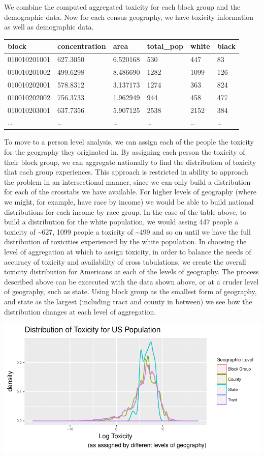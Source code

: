 \documentclass[12pt,twoside]{dukestatscithesis}
\theoremstyle{definition}
\theoremstyle{definition}
\theoremstyle{definition}
\theoremstyle{remark}
\begin{document}
We combine the computed aggregated toxicity for each block group and the
demographic data. Now for each census geography, we have toxicity
information as well as demographic data.
\begin{longtable}[]{@{}llllll@{}}
\toprule
block & concentration & area & total\_pop & white & black\tabularnewline
\midrule
\endhead
010010201001 & 627.3050 & 6.520168 & 530 & 447 & 83\tabularnewline
010010201002 & 499.6298 & 8.486690 & 1282 & 1099 & 126\tabularnewline
010010202001 & 578.8312 & 3.137173 & 1274 & 363 & 824\tabularnewline
010010202002 & 756.3733 & 1.962949 & 944 & 458 & 477\tabularnewline
010010203001 & 637.7356 & 5.907125 & 2538 & 2152 & 384\tabularnewline
\ldots{} & \ldots{} & \ldots{} & \ldots{} & \ldots{} &
\ldots{}\tabularnewline
\bottomrule
\end{longtable}
To move to a person level analysis, we can assign each of the people the
toxicity for the geography they originated in. By assigning each person
the toxicity of their block group, we can aggregate nationally to find
the distribution of toxicity that each group experiences. This approach
is restricted in ability to approach the problem in an intersectional
manner, since we can only build a distribution for each of the crosstabs
we have available. For higher levels of geography (where we might, for
example, have race by income) we would be able to build national
distributions for each income by race group. In the case of the table
above, to build a distribution for the white population, we would assing
447 people a toxicity of \textasciitilde{}627, 1099 people a toxicity of
\textasciitilde{}499 and so on until we have the full distribution of
toxicities experienced by the white population. In choosing the level of
aggregation at which to assign toxicity, in order to balance the needs
of accuracy of toxicity and availability of cross tabulations, we create
the overall toxicity distribution for Americans at each of the levels of
geography. The process described above can be excecuted with the data
shown above, or at a cruder level of geography, such as state. Using
block group as the smallest form of geography, and state as the largest
(including tract and county in between) we see how the distribution
changes at each level of aggregation.

\includegraphics{thesis_files/figure-latex/unnamed-chunk-1-1.pdf}
\end{document}
